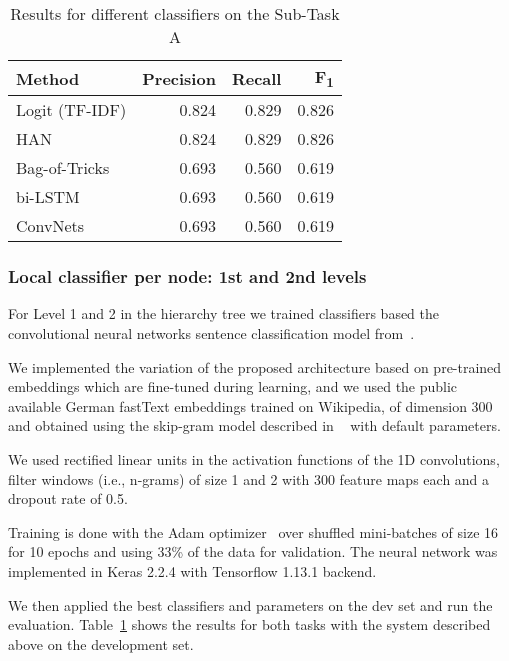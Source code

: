 \documentclass[11pt,a4paper]{article}
\begin{document}
\begin{table}
\begin{center}
\begin{tabular}{|l|r|r|r|}
\hline\centering\textbf{Method}  & \textbf{Precision} &  \textbf{Recall} &  \textbf{F\textsubscript{1}}\\
\hline
 Logit (TF-IDF) & 0.824 & 0.829 & 0.826 \\
 HAN            & 0.824 & 0.829 & 0.826 \\
 Bag-of-Tricks  & 0.693 & 0.560 & 0.619 \\
 bi-LSTM        & 0.693 & 0.560 & 0.619 \\
 ConvNets       & 0.693 & 0.560 & 0.619 \\
\hline
\end{tabular}
\end{center}
\caption{\label{devset-results} Results for different classifiers on the Sub-Task A}
\end{table}




\subsubsection{Local classifier per node: 1st and 2nd levels}

For Level 1 and 2 in the hierarchy tree we trained classifiers based the convolutional
neural networks sentence classification model from~\citet{kim-2014-convolutional}.

We implemented the variation of the proposed architecture based on pre-trained embeddings
which are fine-tuned during learning, and we used the public available German fastText embeddings
trained on Wikipedia, of dimension 300 and obtained using the skip-gram model described in
~\citet{bojanowski-etal-2017-enriching} with default parameters.

We used rectified linear units in the activation functions of the 1D convolutions,
filter windows (i.e., n-grams) of size 1 and 2 with 300 feature maps each and a
dropout rate of 0.5.

Training is done with the Adam optimizer~\cite{journals/corr/KingmaB14} over
shuffled mini-batches of size 16 for 10 epochs and using 33\% of the data for validation.
The neural network was implemented in Keras 2.2.4 with Tensorflow 1.13.1 backend.



We then applied the best classifiers and parameters on the dev set and run the evaluation.
Table~\ref{devset-results} shows the results for both tasks with the system described above on the
development set.
\end{document}
